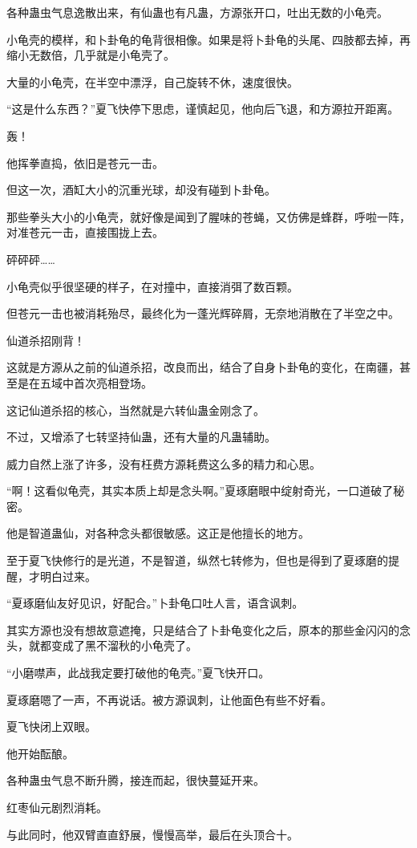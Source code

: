\begin{this_body}
各种蛊虫气息逸散出来，有仙蛊也有凡蛊，方源张开口，吐出无数的小龟壳。

小龟壳的模样，和卜卦龟的龟背很相像。如果是将卜卦龟的头尾、四肢都去掉，再缩小无数倍，几乎就是小龟壳了。

大量的小龟壳，在半空中漂浮，自己旋转不休，速度很快。

“这是什么东西？”夏飞快停下思虑，谨慎起见，他向后飞退，和方源拉开距离。

轰！

他挥拳直捣，依旧是苍元一击。

但这一次，酒缸大小的沉重光球，却没有碰到卜卦龟。

那些拳头大小的小龟壳，就好像是闻到了腥味的苍蝇，又仿佛是蜂群，呼啦一阵，对准苍元一击，直接围拢上去。

砰砰砰……

小龟壳似乎很坚硬的样子，在对撞中，直接消弭了数百颗。

但苍元一击也被消耗殆尽，最终化为一蓬光辉碎屑，无奈地消散在了半空之中。

仙道杀招刚背！

这就是方源从之前的仙道杀招，改良而出，结合了自身卜卦龟的变化，在南疆，甚至是在五域中首次亮相登场。

这记仙道杀招的核心，当然就是六转仙蛊金刚念了。

不过，又增添了七转坚持仙蛊，还有大量的凡蛊辅助。

威力自然上涨了许多，没有枉费方源耗费这么多的精力和心思。

“啊！这看似龟壳，其实本质上却是念头啊。”夏琢磨眼中绽射奇光，一口道破了秘密。

他是智道蛊仙，对各种念头都很敏感。这正是他擅长的地方。

至于夏飞快修行的是光道，不是智道，纵然七转修为，但也是得到了夏琢磨的提醒，才明白过来。

“夏琢磨仙友好见识，好配合。”卜卦龟口吐人言，语含讽刺。

其实方源也没有想故意遮掩，只是结合了卜卦龟变化之后，原本的那些金闪闪的念头，就都变成了黑不溜秋的小龟壳了。

“小磨噤声，此战我定要打破他的龟壳。”夏飞快开口。

夏琢磨嗯了一声，不再说话。被方源讽刺，让他面色有些不好看。

夏飞快闭上双眼。

他开始酝酿。

各种蛊虫气息不断升腾，接连而起，很快蔓延开来。

红枣仙元剧烈消耗。

与此同时，他双臂直直舒展，慢慢高举，最后在头顶合十。


\end{this_body}
